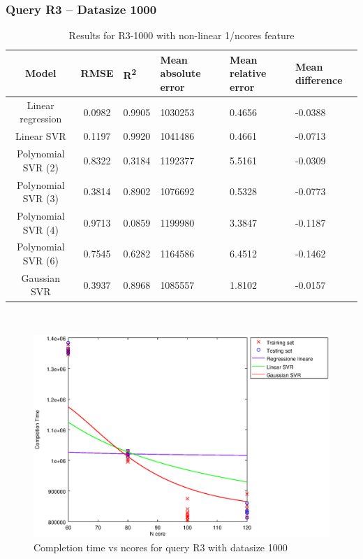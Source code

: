 \documentclass[a4paper,11pt]{article}
\begin{document}
\newpage
\subsubsection{Query R3 -- Datasize 1000}
\begin{table}[H]
	\centering
	\begin{adjustbox}{center}
		\begin{tabular}{c | c M{1.2cm} M{2.5cm} M{2.5cm} M{1.8cm}}
			Model & RMSE & R\textsuperscript{2} & Mean absolute error & Mean relative error & Mean difference \tabularnewline
			\hline
			Linear regression & 0.0982 & 0.9905 & 1030253 & 0.4656 & -0.0388 \\
			Linear SVR & 0.1197 & 0.9920 & 1041486 & 0.4661 & -0.0713 \\
			Polynomial SVR (2) & 0.8322 & 0.3184 & 1192377 & 5.5161 & -0.0309 \\
			Polynomial SVR (3) & 0.3814 & 0.8902 & 1076692 & 0.5328 & -0.0773 \\
			Polynomial SVR (4) & 0.9713 & 0.0859 & 1199980 & 3.3847 & -0.1187 \\
			Polynomial SVR (6) & 0.7545 & 0.6282 & 1164586 & 6.4512 & -0.1462 \\
			Gaussian SVR & 0.3937 & 0.8968 & 1085557 & 1.8102 & -0.0157 \\
		\end{tabular}
	\end{adjustbox}
	\\
	\caption{Results for R3-1000 with non-linear 1/ncores feature}
	\label{table_R3_prediction_all}
\end{table}

\begin {figure}[hbtp]
\centering
\includegraphics[width=\textwidth]{output/R3_1000_1_OVER_NCORES/plot_R3_1000_bestmodels.eps}
\caption {Completion time vs ncores for query R3 with datasize 1000}
\end {figure}
\end{document}
